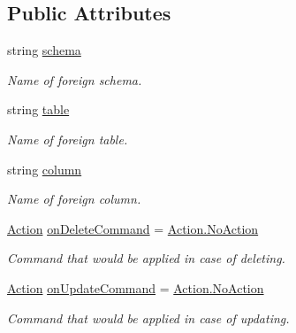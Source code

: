 \subsection*{Public Attributes}
\begin{DoxyCompactItemize}
\item 
string \mbox{\hyperlink{class_uniform_data_operator_1_1_sql_1_1_attributes_1_1_is_foreign_key_a3adbb93b1e9ebb988b6fabf24e10991e}{schema}}
\begin{DoxyCompactList}\small\item\em Name of foreign schema. \end{DoxyCompactList}\item 
string \mbox{\hyperlink{class_uniform_data_operator_1_1_sql_1_1_attributes_1_1_is_foreign_key_ac480fc5f3f8ff86e0bb5877bab793e19}{table}}
\begin{DoxyCompactList}\small\item\em Name of foreign table. \end{DoxyCompactList}\item 
string \mbox{\hyperlink{class_uniform_data_operator_1_1_sql_1_1_attributes_1_1_is_foreign_key_a8d14eef86991a9e1a187876626cbb70b}{column}}
\begin{DoxyCompactList}\small\item\em Name of foreign column. \end{DoxyCompactList}\item 
\mbox{\hyperlink{class_uniform_data_operator_1_1_sql_1_1_attributes_1_1_is_foreign_key_a6039622384e2bbd1aa386e326ee0f850}{Action}} \mbox{\hyperlink{class_uniform_data_operator_1_1_sql_1_1_attributes_1_1_is_foreign_key_af70b31f4805f136d6a32b1fa33d9bbf6}{on\+Delete\+Command}} = \mbox{\hyperlink{class_uniform_data_operator_1_1_sql_1_1_attributes_1_1_is_foreign_key_a6039622384e2bbd1aa386e326ee0f850a1e601ea653db1c729c9ee5746730fabe}{Action.\+No\+Action}}
\begin{DoxyCompactList}\small\item\em Command that would be applied in case of deleting. \end{DoxyCompactList}\item 
\mbox{\hyperlink{class_uniform_data_operator_1_1_sql_1_1_attributes_1_1_is_foreign_key_a6039622384e2bbd1aa386e326ee0f850}{Action}} \mbox{\hyperlink{class_uniform_data_operator_1_1_sql_1_1_attributes_1_1_is_foreign_key_a3a45eb5c4419a10aafcc097c227bb794}{on\+Update\+Command}} = \mbox{\hyperlink{class_uniform_data_operator_1_1_sql_1_1_attributes_1_1_is_foreign_key_a6039622384e2bbd1aa386e326ee0f850a1e601ea653db1c729c9ee5746730fabe}{Action.\+No\+Action}}
\begin{DoxyCompactList}\small\item\em Command that would be applied in case of updating. \end{DoxyCompactList}\end{DoxyCompactItemize}
